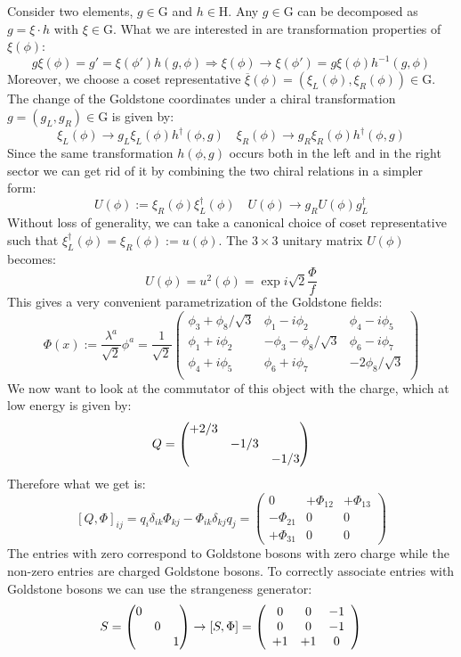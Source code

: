 \documentclass[../main.tex]{subfiles}
\begin{document}
Consider two elements, $g\in\text{G}$ and $h\in\text{H}$. Any $g\in\text{G}$ can be decomposed as $g=\xi\cdot h$ with $\xi\in\text{G}$. What we are interested in are transformation properties of $\xi(\phi)$:
\[
g\xi(\phi)=g'=\xi(\phi')h(g,\phi)\Rightarrow\xi(\phi)\to\xi(\phi')=g\xi(\phi)h^{-1}(g,\phi)
\]
Moreover, we choose a coset representative $\overline{\xi}(\phi)=(\xi_L(\phi),\xi_R(\phi))\in\text{G}$. The change of the Goldstone coordinates under a chiral transformation $g=(g_L,g_R)\in\text{G}$ is given by:
\[
\xi_L(\phi)\to g_L\xi_L(\phi)h^\dagger(\phi,g) \quad \xi_R(\phi)\to g_R\xi_R(\phi)h^\dagger(\phi,g)
\]
Since the same transformation $h(\phi,g)$ occurs both in the left and in the right sector we can get rid of it by combining the two chiral relations in a simpler form:
\[
U(\phi):=\xi_R(\phi)\xi_L^\dagger(\phi) \quad U(\phi)\to g_RU(\phi)g_L^\dagger
\]
Without loss of generality, we can take a canonical choice of coset representative such that $\xi_L^\dagger(\phi)=\xi_R(\phi):=u(\phi)$. The $3\times3$ unitary matrix $U(\phi)$ becomes:
\[
U(\phi)=u^2(\phi)=\exp{i\sqrt{2}\frac{\Phi}{f}}
\]
This gives a very convenient parametrization of the Goldstone fields:
\[
\Phi(x):=\frac{\lambda^a}{\sqrt{2}}\phi^a=\frac{1}{\sqrt{2}}\left(\begin{array}{ccc}
    \phi_3+\phi_8/\sqrt{3} & \phi_1-i\phi_2 & \phi_4-i\phi_5 \\
    \phi_1+i\phi_2 & -\phi_3-\phi_8/\sqrt{3} & \phi_6-i\phi_7 \\
    \phi_4+i\phi_5 & \phi_6+i\phi_7 & -2\phi_8/\sqrt{3} \\
\end{array}\right)
\]
We now want to look at the commutator of this object with the charge, which at low energy is given by:
\[
Q=\mqty(\dmat{+2/3,-1/3,-1/3})
\]
Therefore what we get is:
\[
[Q,\Phi]_{ij}=q_i\delta_{ik}\Phi_{kj}-\Phi_{ik}\delta_{kj}q_j=\left(\begin{array}{ccc}
    0 & +\Phi_{12} & +\Phi_{13} \\
    -\Phi_{21} & 0 & 0 \\
    +\Phi_{31} & 0 & 0
\end{array}\right)
\]
The entries with zero correspond to Goldstone bosons with zero charge while the non-zero entries are charged Goldstone bosons. To correctly associate entries with Goldstone bosons we can use the strangeness generator:
\[
S=\mqty(\dmat{0,0,1})\to[S,\Phi]=\left(\begin{array}{ccc}
    0 & 0 & -1 \\
    0 & 0 & -1 \\
    +1 & +1 & 0
\end{array}\right)
\]
\end{document}
